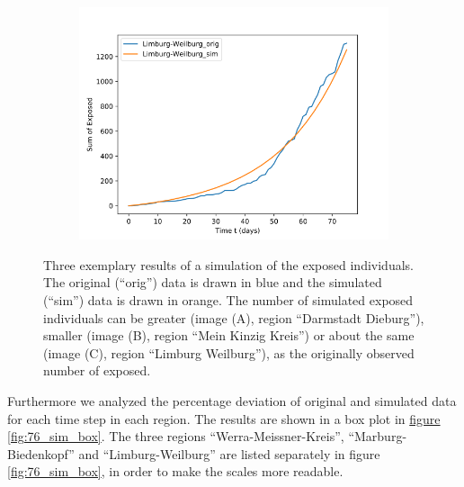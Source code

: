 \begin{figure}
\begin{subfigure}[b]{0.3\textwidth}
		\includegraphics[width=\textwidth]{./figures/76d/10_Limburg-Weilburg.png}	
		\caption{}
	\end{subfigure}
	\caption{Three exemplary results of a simulation of the exposed individuals.
		The original (``orig'') data is drawn in blue and the simulated (``sim'') data is drawn in orange.
		The number of simulated exposed individuals can be greater (image (A), region ``Darmstadt Dieburg''), smaller 
		(image (B), region ``Mein Kinzig Kreis'') or about the same (image (C), region ``Limburg Weilburg''), as 
		the originally observed number of exposed.
		}
	\label{fig:76_sim_expl}
\end{figure}

Furthermore we analyzed the percentage deviation of original and simulated data for each time step in each region. The results
are shown in a box plot in \hyperref[fig:76_sim_box]{figure \ref*{fig:76_sim_box}}. The three regions ``Werra-Meissner-Kreis'',
``Marburg-Biedenkopf'' and ``Limburg-Weilburg'' are listed separately in figure \ref*{fig:76_sim_box}, in order to make the scales
more readable.



